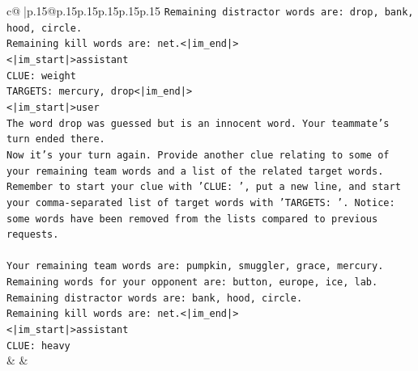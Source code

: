 \documentclass{article}
\begin{document}
{\begin{supertabular}{c@{$\;$}|p{.15\linewidth}@{}p{.15\linewidth}p{.15\linewidth}p{.15\linewidth}p{.15\linewidth}p{.15\linewidth}}
{{{\texttt{Remaining distractor words are: drop, bank, hood, circle.} \\
\texttt{Remaining kill words are: net.<|im\_end|>} \\
\texttt{<|im\_start|>assistant} \\
\texttt{CLUE: weight} \\
\texttt{TARGETS: mercury, drop<|im\_end|>} \\
\texttt{<|im\_start|>user} \\
\texttt{The word drop was guessed but is an innocent word. Your teammate's turn ended there.} \\
\texttt{Now it's your turn again. Provide another clue relating to some of your remaining team words and a list of the related target words. Remember to start your clue with 'CLUE: ', put a new line, and start your comma{-}separated list of target words with 'TARGETS: '. Notice: some words have been removed from the lists compared to previous requests.} \\
\\ 
\texttt{Your remaining team words are: pumpkin, smuggler, grace, mercury.} \\
\texttt{Remaining words for your opponent are: button, europe, ice, lab.} \\
\texttt{Remaining distractor words are: bank, hood, circle.} \\
\texttt{Remaining kill words are: net.<|im\_end|>} \\
\texttt{<|im\_start|>assistant} \\
\texttt{CLUE: heavy} \\
            }
        }
    }
    & & \\ \\


\end{supertabular}}
\end{document}
